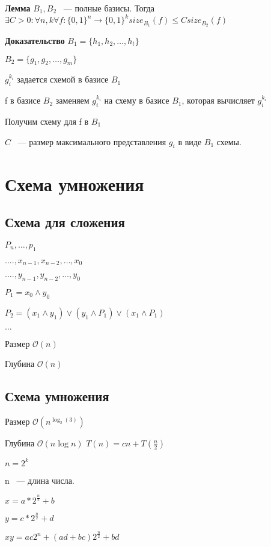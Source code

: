 \documentclass[12pt]{article}
\def\O{\mathcal{O}}
\begin{document}
\begin{description}
\item{\bf Лемма} $B_1, B_2$ ~--- полные базисы. Тогда $\exists C > 0: \forall n, k \forall f:\{0, 1\}^n \to \{0, 1\}^k size_{B_1}(f) \le C size_{B_2}(f)$
\item{\bf Доказательство}
$B_1 = \{h_1, h_2, \ldots, h_t\}$

$B_2 = \{g_1, g_2, \ldots, g_m\}$

$g_i^{k_i}$ задается схемой в базисе $B_1$ 

f в базисе $B_2$ заменяем $g_i^{k_i}$ на схему в базисе $B_1$, которая вычисляет $g_i^{k_i}$ 

Получим схему для f в $B_1$

$C$ ~--- размер максимального представления $g_i$ в виде $B_1$ схемы.
\end{description}

\section{Схема умножения}

\subsection{Схема для сложения}
 
$P_n, \ldots, p_1$

$...., x_{n - 1}, x_{n - 2}, \ldots, x_0$


$...., y_{n - 1}, y_{n - 2}, \ldots, y_0$

$P_1 = x_0 \wedge y_0$

$P_2 = (x_1 \wedge y_1) \vee (y_1 \wedge P_1) \vee (x_1 \wedge P_1)$

$\ldots$

Размер $\O(n)$

Глубина $\O(n)$

\subsection{Схема умножения}

Размер $\O(n^{\log_2(3)})$

Глубина $\O(n \log n)$ $T(n) = cn + T(\frac{n}{2})$

$n = 2^k$ 

n ~--- длина числа.

$x = a * 2^{\frac{n}{2}} + b$

$y = c * 2^{\frac{n}{2}} + d$

$xy = ac2^n + (ad + bc)2^{\frac{n}{2}} + bd$
\end{document}
